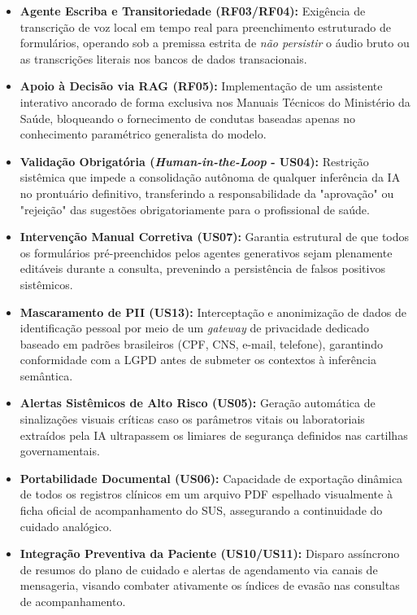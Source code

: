 \documentclass[12pt]{article}
\begin{document}
\begin{itemize}
  \item \textbf{Agente Escriba e Transitoriedade (RF03/RF04):} Exigência de transcrição de voz local em tempo real para preenchimento estruturado de formulários, operando sob a premissa estrita de \textit{não persistir} o áudio bruto ou as transcrições literais nos bancos de dados transacionais.
  \item \textbf{Apoio à Decisão via RAG (RF05):} Implementação de um assistente interativo ancorado de forma exclusiva nos Manuais Técnicos do Ministério da Saúde, bloqueando o fornecimento de condutas baseadas apenas no conhecimento paramétrico generalista do modelo.
  \item \textbf{Validação Obrigatória (\textit{Human-in-the-Loop} - US04):} Restrição sistêmica que impede a consolidação autônoma de qualquer inferência da IA no prontuário definitivo, transferindo a responsabilidade da "aprovação" ou "rejeição" das sugestões obrigatoriamente para o profissional de saúde.
  \item \textbf{Intervenção Manual Corretiva (US07):} Garantia estrutural de que todos os formulários pré-preenchidos pelos agentes generativos sejam plenamente editáveis durante a consulta, prevenindo a persistência de falsos positivos sistêmicos.
  \item \textbf{Mascaramento de PII (US13):} Interceptação e anonimização de dados de identificação pessoal por meio de um \textit{gateway} de privacidade dedicado baseado em padrões brasileiros (CPF, CNS, e-mail, telefone), garantindo conformidade com a LGPD antes de submeter os contextos à inferência semântica.
  \item \textbf{Alertas Sistêmicos de Alto Risco (US05):} Geração automática de sinalizações visuais críticas caso os parâmetros vitais ou laboratoriais extraídos pela IA ultrapassem os limiares de segurança definidos nas cartilhas governamentais.
  \item \textbf{Portabilidade Documental (US06):} Capacidade de exportação dinâmica de todos os registros clínicos em um arquivo PDF espelhado visualmente à ficha oficial de acompanhamento do SUS, assegurando a continuidade do cuidado analógico.
  \item \textbf{Integração Preventiva da Paciente (US10/US11):} Disparo assíncrono de resumos do plano de cuidado e alertas de agendamento via canais de mensageria, visando combater ativamente os índices de evasão nas consultas de acompanhamento.
\end{itemize}
\end{document}
